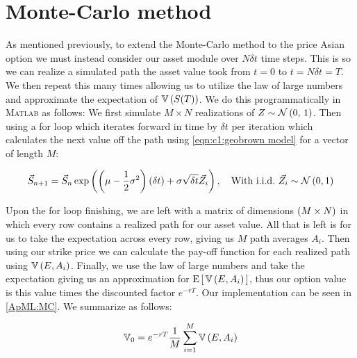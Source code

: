 \section{Monte-Carlo method}

As mentioned previously, to extend the Monte-Carlo method to the price Asian option we must instead consider our asset module over \(N \delta t\) time steps. This is so we can realize a simulated path the asset value took from \(t = 0\) to \(t = N\delta t = T\). We then repeat this many times allowing us to utilize the law of large numbers and approximate the expectation of \(\mathbb{V}\left(S(T)\right)\).
\nline{}
We do this programmatically in \textsc{Matlab} as follows: We first simulate \(M \times N\) realizations of \(Z \sim \mathcal{N}\left(0,\,1\right)\). Then using a for loop which iterates forward in time by \(\delta t\) per iteration which calculates the next value off the path using \autoref{eqn:c1:geobrown model} for a vector of length \(M \):

\begin{equation*}
    \vec{S}_{n+1} = \vec{S}_n\exp\left(\left(\mu-\frac{1}{2}\sigma^2\right)\left(\delta t\right) + \sigma\sqrt{\delta t}\vec{Z_i}\right), \quad \text{With i.i.d.~} \vec{Z_i} \sim \mathcal{N}\left(0,1\right)
\end{equation*}

Upon the for loop finishing, we are left with a matrix of dimensions \(\left(M \times N\right)\) in which every row contains a realized path for our asset value. All that is left is for us to take the expectation across every row, giving us \(M \) path averages \(A_i \). Then using our strike price we can calculate the pay-off function for each realized path using \(\mathbb{V}\left(E, A_i\right)\). Finally, we use the law of large numbers and take the expectation giving us an approximation for \(\text{E}\left[\,\mathbb{V}\left(E, A_i\right)\,\right]\), thus our option value is this value times the discounted factor \(e^{-rT}\). Our implementation can be seen in \autoref{ApML:MC}.
\nline{}
We summarize as follows:

\begin{equation*}
    \mathbb{V}_0 = e^{-rT}\frac{1}{M}\sum_{i=1}^M\mathbb{V}\left(E, A_i\right)
\end{equation*}
